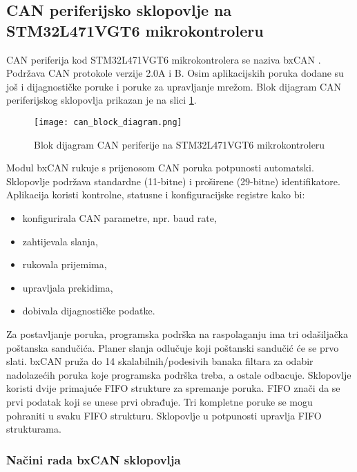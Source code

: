 \subsection{CAN periferijsko sklopovlje na STM32L471VGT6 mikrokontroleru}

CAN periferija kod STM32L471VGT6 mikrokontrolera se naziva bxCAN . Podržava CAN protokole verzije 2.0A i B. Osim aplikacijskih poruka dodane su još i dijagnostičke poruke i poruke za upravljanje mrežom. Blok dijagram CAN periferijskog sklopovlja prikazan je na slici \ref{fig:can_block_diagram}.
\begin{figure}[H]
	\centering
	\texttt{[image: can\_block\_diagram.png]}
	\caption{Blok dijagram CAN periferije na STM32L471VGT6 mikrokontroleru}
	\label{fig:can_block_diagram}
\end{figure}
Modul bxCAN rukuje s prijenosom CAN poruka potpunosti automatski. Sklopovlje podržava standardne (11-bitne) i proširene (29-bitne) identifikatore. Aplikacija koristi kontrolne, statusne i konfiguracijske registre kako bi:
\begin{itemize}
	\item konfigurirala CAN parametre, npr. baud rate,
	\item zahtijevala slanja,
	\item rukovala prijemima,
	\item upravljala prekidima,
	\item dobivala dijagnostičke podatke.
\end{itemize}
Za postavljanje poruka, programska podrška na raspolaganju ima tri odašiljačka poštanska sandučića. Planer slanja odlučuje koji poštanski sandučić će se prvo slati. bxCAN pruža do 14 skalabilnih/podesivih banaka filtara za odabir nadolazećih poruka koje programska podrška treba, a ostale odbacuje. Sklopovlje koristi dvije primajuće FIFO  strukture za spremanje poruka. FIFO znači da se prvi podatak koji se unese prvi obrađuje. Tri kompletne poruke se mogu pohraniti u svaku FIFO strukturu. Sklopovlje u potpunosti upravlja FIFO strukturama.

\subsubsection{Načini rada bxCAN sklopovlja}

